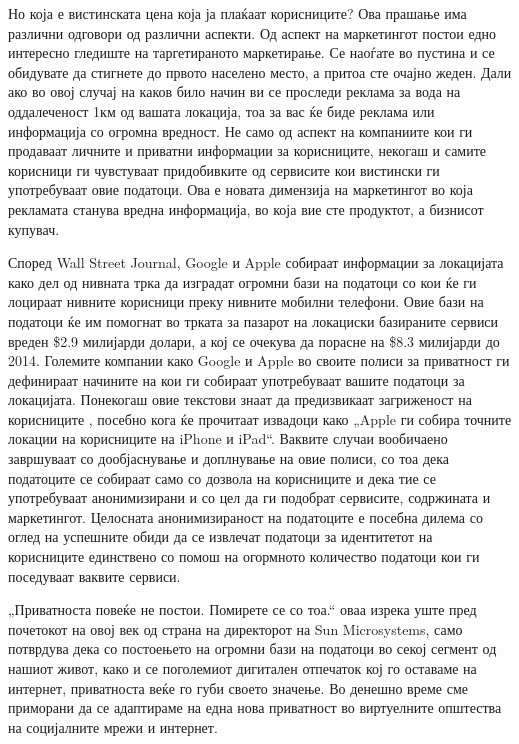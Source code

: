 \documentclass[12pt,a4paper]{article}
\begin{document}
Но која е вистинската цена која ја плаќаат корисниците? Ова прашање има различни
одговори од различни аспекти. Од аспект на маркетингот постои едно интересно
гледиште на таргетираното маркетирање. Се наоѓате во пустина и се обидувате да
стигнете до првото населено место, а притоа сте очајно жеден. Дали ако во овој
случај на каков било начин ви се проследи реклама за вода на оддалеченост 1км
од вашата локација, тоа за вас ќе биде реклама или информација со огромна
вредност. Не само од аспект на компаниите кои ги продаваат личните и приватни
информации за корисниците, некогаш и самите корисници ги чувстуваат придобивките
од сервисите кои вистински ги употребуваат овие податоци. Ова е новата димензија
на маркетингот во која рекламата станува вредна информација, во која вие сте
продуктот, а бизнисот купувач.

Според Wall Street Journal\cite{appleGoogle}, Google и Apple собираат информации
за локацијата како дел од нивната трка да изградат огромни бази на податоци со
кои ќе ги лоцираат нивните корисници преку нивните мобилни телефони. Овие бази
на податоци ќе им помогнат во трката за пазарот на локациски базираните сервиси
вреден \$2.9 милијарди долари, а кој се очекува да порасне на \$8.3 милијарди до
2014. Големите компании како Google и Apple во своите полиси за приватност
\cite{applePrivacy,googlePrivacy} ги дефинираат начините на кои ги собираат
употребуваат вашите податоци за локацијата. Понекогаш овие текстови знаат да
предизвикаат загриженост на корисниците \cite{latimes}, посебно кога ќе
прочитаат извадоци како „Apple ги собира точните локации на корисниците на iPhone и iPad“.
Ваквите случаи вообичаено завршуваат со дообјаснување и доплнување на овие
полиси, со тоа дека податоците се собираат само со дозвола на корисниците и дека
тие се употребуваат анонимизирани и со цел да ги подобрат сервисите, содржината
и маркетингот. Целосната анонимизираност на податоците е посебна дилема со оглед
на успешните обиди \cite{narayanan2008robust} да се извлечат податоци за
идентитетот на корисниците единствено со помош на огормното количество податоци
кои ги поседуваат ваквите сервиси.

„Приватноста повеќе не постои. Помирете се со тоа.“ \cite{dead} оваа изрека уште
пред почетокот на овој век од страна на директорот на Sun Microsystems, само
потврдува дека со постоењето на огромни бази на податоци во секој сегмент од
нашиот живот, како и се поголемиот дигитален отпечаток кој го оставаме на
интернет, приватноста веќе го губи своето значење. Во денешно време сме
приморани да се адаптираме на една нова приватност во виртуелните општества на
социјалните мрежи и интернет.
\end{document}
